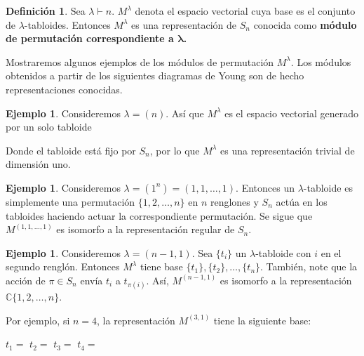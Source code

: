 \documentclass[12pt]{book}
\theoremstyle{definition}
\newtheorem{definition}[theorem]{Definición}
\newtheorem{example}[theorem]{Ejemplo}
\newcounter{in}
\newcounter{ini}
\begin{document}
\begin{definition}
  Sea $\lambda\vdash n$. $M^{\lambda}$ denota el espacio vectorial
  cuya base es el conjunto de $\lambda$-tabloides. Entonces
  $M^{\lambda}$ es una representación de $S_{n}$ conocida como \textbf{módulo
  de permutación correspondiente a $\boldsymbol{\lambda}$.}
\end{definition}

Mostraremos algunos ejemplos de los módulos de
permutación $M^{\lambda}$. Los módulos obtenidos a partir de los siguientes diagramas de
Young son de hecho representaciones conocidas.

\begin{center}
   \qquad
  \qquad
\end{center}

\begin{example}
  Consideremos $\lambda=(n)$. Así que $M^{\lambda}$ es el espacio
  vectorial generado por un solo tabloide 
  \begin{center}
  \end{center}
Donde el tabloide está fijo por $S_{n}$, por lo que $M^{\lambda}$ es
una representación trivial de dimensión uno.
\end{example}

\begin{example}
  Consideremos $\lambda=(1^{n})=(1,1,\ldots,1)$. Entonces un $\lambda$-tabloide es
  simplemente una permutación $\{1,2,\ldots,n\}$ en $n$ renglones y $S_{n}$ actúa en los
  tabloides haciendo actuar la correspondiente permutación. Se sigue que $M^{(1,1,\ldots,1)}$ es
  isomorfo a la representación regular de $S_{n}$.
\end{example}

\begin{example}
  \label{tabloides-ejemplo}
  Consideremos
  $\lambda=(n-1,1)$. Sea $\{t_{i}\}$
  un $\lambda$-tabloide con $i$ en
  el segundo renglón. Entonces
  $M^{\lambda}$ tiene base
  $\{t_{1}\},\{t_{2}\},\ldots,\{t_{n}\}$. También,
  note que la acción de $\pi\in
  S_{n}$ envía $t_{i}$ a $t_{\pi(i)}$. Así,
  $M^{(n-1,1)}$ es isomorfo a la
  representación $\mathbb{C}\{1,2,\ldots,n\}$. 

  Por ejemplo, si $n=4$, la
  representación $M^{(3,1)}$ tiene
  la siguiente base:
  \begin{center}
    $t_{1}=$\qquad 
    $t_{2}=$ \qquad
    $t_{3}=$ \qquad
    $t_{4}=$ \qquad
  \end{center}
\end{example}
\end{document}
